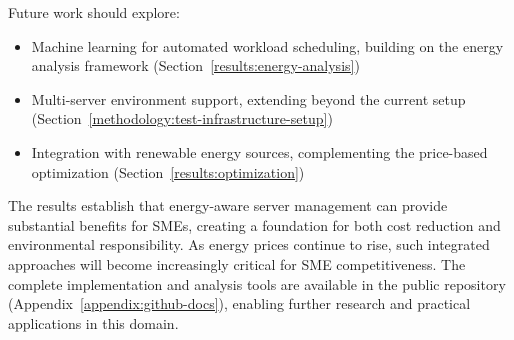 Future work should explore:
\begin{itemize}
    \item Machine learning for automated workload scheduling, building on the energy analysis framework (Section~\ref{results:energy-analysis})
    \item Multi-server environment support, extending beyond the current setup (Section~\ref{methodology:test-infrastructure-setup})
    \item Integration with renewable energy sources, complementing the price-based optimization (Section~\ref{results:optimization})
\end{itemize}

The results establish that energy-aware server management can provide substantial benefits for SMEs, creating a foundation for both cost reduction and environmental responsibility. As energy prices continue to rise, such integrated approaches will become increasingly critical for SME competitiveness. The complete implementation and analysis tools are available in the public repository (Appendix~\ref{appendix:github-docs}), enabling further research and practical applications in this domain.